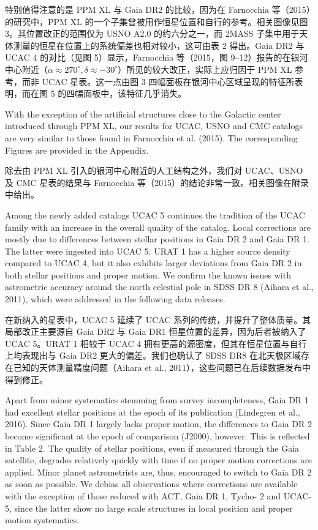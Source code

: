 特别值得注意的是 PPM XL 与 Gaia DR2 的比较，因为在 Farnocchia 等（2015）的研究中，PPM XL 的一个子集曾被用作恒星位置和自行的参考。相关图像见图 3。其位置改正的范围仅为 USNO A2.0 的约六分之一，而 2MASS 子集中用于天体测量的恒星在位置上的系统偏差也相对较小，这可由表 2 得出。Gaia DR2 与 UCAC 4 的对比（见图 5）显示，Farnocchia 等（2015，图 9–12）报告的在银河中心附近（$\alpha \approx 270^\circ, \delta \approx -30^\circ$）所见的较大改正，实际上应归因于 PPM XL 参考，而非 UCAC 星表。这一点由图 3 四幅面板在银河中心区域呈现的特征所表明，而在图 5 的四幅面板中，该特征几乎消失。

With the exception of the artificial structures close to the Galactic center introduced through PPM XL, our results for UCAC, USNO and CMC catalogs are very similar to those found in Farnocchia et al. (2015). The corresponding Figures are provided in the Appendix. 

除去由 PPM XL 引入的银河中心附近的人工结构之外，我们对 UCAC、USNO 及 CMC 星表的结果与 Farnocchia 等（2015）的结论非常一致。相关图像在附录中给出。

Among the newly added catalogs UCAC 5 continues the tradition of the UCAC family with an increase in the overall quality of the catalog. Local corrections are mostly due to differences between stellar positions in Gaia DR 2 and Gaia DR 1. The latter were ingested into UCAC 5. URAT 1 has a higher source density compared to UCAC 4, but it also exhibits larger deviations from Gaia DR 2 in both stellar positions and proper motion. We confirm the known issues with astrometric accuracy around the north celestial pole in SDSS DR 8 (Aihara et al., 2011), which were addressed in the following data releases. 

在新纳入的星表中，UCAC 5 延续了 UCAC 系列的传统，并提升了整体质量。其局部改正主要源自 Gaia DR2 与 Gaia DR1 恒星位置的差异，因为后者被纳入了 UCAC 5。URAT 1 相较于 UCAC 4 拥有更高的源密度，但其在恒星位置与自行上均表现出与 Gaia DR2 更大的偏差。我们也确认了 SDSS DR8 在北天极区域存在已知的天体测量精度问题（Aihara et al., 2011），这些问题已在后续数据发布中得到修正。

Apart from minor systematics stemming from survey incompleteness, Gaia DR 1 had excellent stellar positions at the epoch of its publication (Lindegren et al., 2016). Since Gaia DR 1 largely lacks proper motion, the differences to Gaia DR 2 become significant at the epoch of comparison (J2000), however. This is reflected in Table 2. The quality of stellar positions, even if measured through the Gaia satellite, degrades relatively quickly with time if no proper motion corrections are applied. Minor planet astrometrists are, thus, encouraged to switch to Gaia DR 2 as soon as possible. We debias all observations where corrections are available with the exception of those reduced with ACT, Gaia DR 1, Tycho- 2 and UCAC- 5, since the latter show no large scale structures in local position and proper motion systematics.

